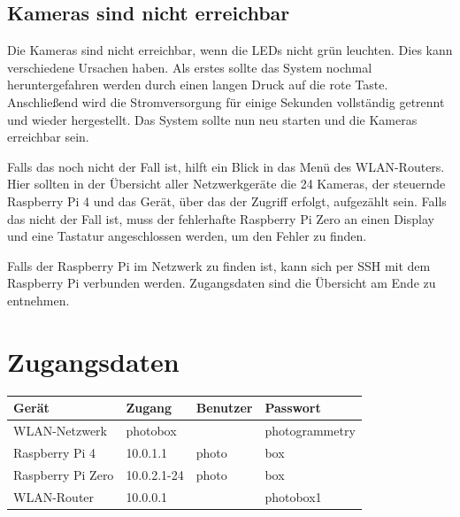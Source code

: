 \documentclass[./00PhotoBox.tex]{subfiles}
\begin{document}
\subsection{Kameras sind nicht erreichbar}
Die Kameras sind nicht erreichbar, wenn die LEDs nicht grün leuchten. Dies kann verschiedene Ursachen haben. Als erstes sollte das System nochmal heruntergefahren werden durch einen langen Druck auf die rote Taste. Anschließend wird die Stromversorgung für einige Sekunden vollständig getrennt und wieder hergestellt. Das System sollte nun neu starten und die Kameras erreichbar sein.

Falls das noch nicht der Fall ist, hilft ein Blick in das Menü des WLAN-Routers. Hier sollten in der Übersicht aller Netzwerkgeräte die 24 Kameras, der steuernde Raspberry Pi 4 und das Gerät, über das der Zugriff erfolgt, aufgezählt sein. Falls das nicht der Fall ist, muss der fehlerhafte Raspberry Pi Zero an einen Display und eine Tastatur angeschlossen werden, um den Fehler zu finden.

Falls der Raspberry Pi im Netzwerk zu finden ist, kann sich per SSH mit dem Raspberry Pi verbunden werden. Zugangsdaten sind die Übersicht am Ende zu entnehmen.

\section{Zugangsdaten}

\begin{tabular}{|l|l|l|l|}
    \hline
    \textbf{Gerät}    & \textbf{Zugang} & \textbf{Benutzer} & \textbf{Passwort} \\
    \hline
    WLAN-Netzwerk     & photobox        &                   & photogrammetry    \\
    \hline
    Raspberry Pi 4    & 10.0.1.1        & photo             & box               \\
    \hline
    Raspberry Pi Zero & 10.0.2.1-24     & photo             & box               \\
    \hline
    WLAN-Router       & 10.0.0.1        &                   & photobox1         \\
    \hline
\end{tabular}

\end{document}
